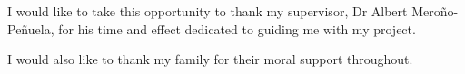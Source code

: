 I would like to take this opportunity to thank my supervisor, Dr Albert Mero{\~n}o-Pe{\~n}uela, for his time and effect dedicated to guiding me with my project. 

I would also like to thank my family for their moral support throughout. 